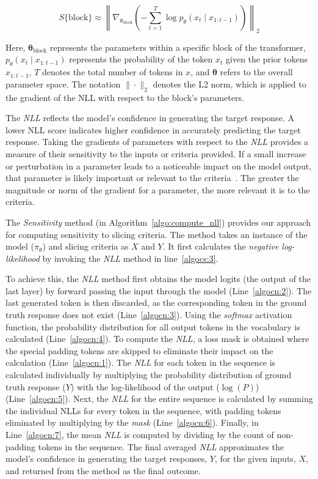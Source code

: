 \[
\label{eq:sen1}
S\{\text{block}\} \approx \left\| \nabla_{\theta_{\text{block}}} \left( -\sum_{t=1}^{T} \log p_{\theta}(x_t \mid x_{1:t-1}) \right) \right\|_2
\]

Here, \( \mathbf{\theta}_{\text{block}} \) represents the parameters within a specific block of the transformer, \( p_\theta(x_t \mid x_{1:t-1}) \) represents the probability of the token \( x_t \) given the prior tokens \( x_{1:t-1} \), \( T \) denotes the total number of tokens in \( x \), and \( \mathbf{\theta} \) refers to the overall parameter space. The notation \( \| \cdot \|_2 \) denotes the L2 norm, which is applied to the gradient of the NLL with respect to the block's parameters.



The \textit{NLL} reflects the model's confidence in generating the target response. A lower NLL score indicates higher confidence in accurately predicting the target response. Taking the gradients of parameters with respect to the \textit{NLL} provides a measure of their sensitivity to the inputs or criteria provided. If a small increase or perturbation in a parameter leads to a noticeable impact on the model output, that parameter is likely important or relevant to the criteria~\cite{kirkpatrick2017overcoming}. The greater the magnitude or norm of the gradient for a parameter, the more relevant it is to the criteria.




The \textit{Sensitivity} method (in Algorithm~\ref{algo:compute_nll}) provides our approach for computing sensitivity to slicing criteria. The method takes an instance of the model ($\pi_{\theta}$) and slicing criteria as $X$ and $Y$. It first calculates the \textit{negative log-likelihood} by invoking the \textit{NLL} method in line~\ref{algocs:3}.

To achieve this, the \textit{NLL} method first obtains the model logits (the output of the last layer) by forward passing the input through the model (Line~\ref{algocn:2}). The last generated token is then discarded, as the corresponding token in the ground truth response does not exist (Line~\ref{algocn:3}). Using the \textit{softmax} activation function, the probability distribution for all output tokens in the vocabulary is calculated (Line~\ref{algocn:4}). To compute the \textit{NLL}, a loss mask is obtained where the special padding tokens are skipped to eliminate their impact on the calculation (Line~\ref{algocn:1}). The \textit{NLL} for each token in the sequence is calculated individually by multiplying the probability distribution of ground truth response ($Y$) with the log-likelihood of the output ($\log(P)$) (Line~\ref{algocn:5}). Next, the \textit{NLL} for the entire sequence is calculated by summing the individual NLLs for every token in the sequence, with padding tokens eliminated by multiplying by the \textit{mask} (Line~\ref{algocn:6}). Finally, in Line~\ref{algocn:7}, the mean \textit{NLL} is computed by dividing by the count of non-padding tokens in the sequence. The final averaged \textit{NLL} approximates the model's confidence in generating the target responses, $Y$, for the given inputs, $X$, and returned from the method as the final outcome.



